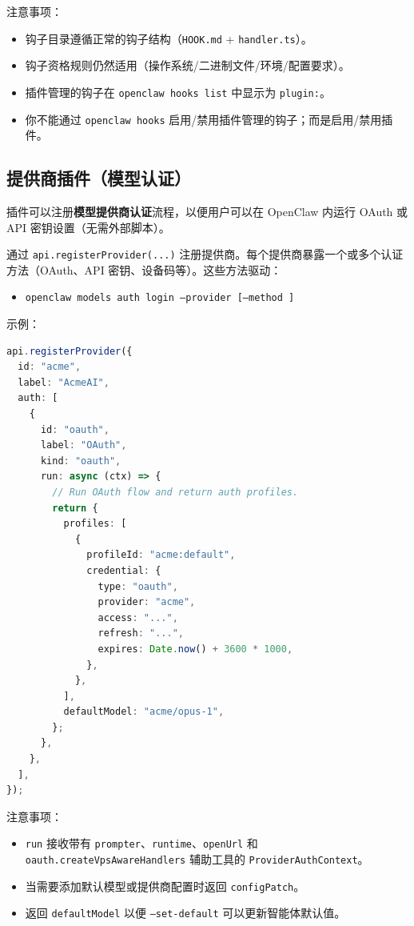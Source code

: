 注意事项：

\begin{itemize}
  \item 钩子目录遵循正常的钩子结构（\texttt{HOOK.md} + \texttt{handler.ts}）。
  \item 钩子资格规则仍然适用（操作系统/二进制文件/环境/配置要求）。
  \item 插件管理的钩子在 \texttt{openclaw hooks list} 中显示为 \texttt{plugin:}。
  \item 你不能通过 \texttt{openclaw hooks} 启用/禁用插件管理的钩子；而是启用/禁用插件。
\end{itemize}


\subsection{提供商插件（模型认证）}


插件可以注册\textbf{模型提供商认证}流程，以便用户可以在 OpenClaw 内运行 OAuth 或 API 密钥设置（无需外部脚本）。

通过 \texttt{api.registerProvider(...)} 注册提供商。每个提供商暴露一个或多个认证方法（OAuth、API 密钥、设备码等）。这些方法驱动：

\begin{itemize}
  \item \texttt{openclaw models auth login --provider  [--method ]}
\end{itemize}


示例：

\begin{lstlisting}[language=typescript]
api.registerProvider({
  id: "acme",
  label: "AcmeAI",
  auth: [
    {
      id: "oauth",
      label: "OAuth",
      kind: "oauth",
      run: async (ctx) => {
        // Run OAuth flow and return auth profiles.
        return {
          profiles: [
            {
              profileId: "acme:default",
              credential: {
                type: "oauth",
                provider: "acme",
                access: "...",
                refresh: "...",
                expires: Date.now() + 3600 * 1000,
              },
            },
          ],
          defaultModel: "acme/opus-1",
        };
      },
    },
  ],
});
\end{lstlisting}


注意事项：

\begin{itemize}
  \item \texttt{run} 接收带有 \texttt{prompter}、\texttt{runtime}、\texttt{openUrl} 和 \texttt{oauth.createVpsAwareHandlers} 辅助工具的 \texttt{ProviderAuthContext}。
  \item 当需要添加默认模型或提供商配置时返回 \texttt{configPatch}。
  \item 返回 \texttt{defaultModel} 以便 \texttt{--set-default} 可以更新智能体默认值。
\end{itemize}


